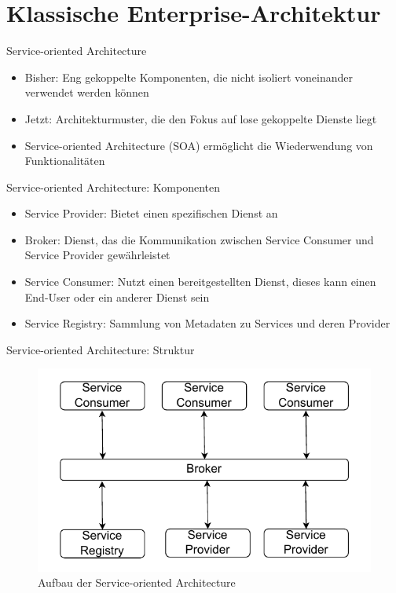 \section{Klassische Enterprise-Architektur}


\begin{frame}{Service-oriented Architecture}
  \begin{itemize}
    \item Bisher: Eng gekoppelte Komponenten, die nicht isoliert voneinander verwendet werden können
    \item Jetzt: Architekturmuster, die den Fokus auf lose gekoppelte Dienste liegt
    \item Service-oriented Architecture (SOA) ermöglicht die Wiederwendung von Funktionalitäten
  \end{itemize}
\end{frame}

\begin{frame}{Service-oriented Architecture: Komponenten}
  \begin{itemize}
    \item Service Provider: Bietet einen spezifischen Dienst an
    \item Broker: Dienst, das die Kommunikation zwischen Service Consumer und Service Provider gewährleistet
    \item Service Consumer: Nutzt einen bereitgestellten Dienst, dieses kann einen End-User oder ein anderer Dienst sein
    \item Service Registry: Sammlung von Metadaten zu Services und deren Provider
  \end{itemize}
\end{frame}

\begin{frame}{Service-oriented Architecture: Struktur}
  \begin{figure}[!h]
    \centering
    \includegraphics[scale=0.80]{imglib/soa/soa}
    \caption{Aufbau der Service-oriented Architecture}
    \label{fig:soa}
  \end{figure}
\end{frame}

